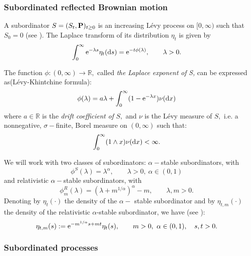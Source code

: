 \documentclass[11pt]{article}
\begin{document}
\subsubsection{Subordinated reflected Brownian motion}
A subordinator $S=(S_{t},{\bf P})_{t \geq 0}$ is an  increasing L\'evy process on $[0, \infty)$ such that $S_{0}=0$ (see \cite{bib:Ber}). \linebreak The Laplace transform of its distribution  $\eta_{t}$ is given by
$$
 \int_{0}^{\infty}{\rm e}^{-\lambda s}\eta_{t}({\rm d}s)={\rm e}^{-t\phi(\lambda)}, \qquad  \lambda > 0.
$$

The function $\phi:(0,\infty) \rightarrow \mathbb{R},$ called \textit{the Laplace exponent of S,} can be expressed as\linebreak({L\'evy-Khintchine formula}):
$$
\phi(\lambda) = a\lambda + \int_{0}^{\infty}(1 - {\rm e}^{-\lambda x})\nu({\rm d}x)
$$
where $a\in\mathbb R$  is the {\em drift coefficient of $S,$ }and $\nu$ is the L\'evy measure of $S,$ i.e. a nonnegative, $\sigma-$finite,  Borel measure on $(0, \infty)$ such that:
\begin{equation}\label{eq:Levy_measure_cond}
\int_{0}^{\infty}(1 \land x)\nu({\rm d}x) < \infty.
\end{equation}

\noindent We will work with two classes of subordinators: $\alpha-$stable subordinators, with
\begin{equation}\label{eq:phi_stable}
\phi^S(\lambda) = \lambda^{\alpha} , \qquad \lambda > 0, \ \alpha \in (0,1)
\end{equation}
and relativistic $\alpha-$stable subordinators, with
\begin{equation}\label{eq:phi_relativistic}
\phi^R_m(\lambda) = (\lambda + m^{1/\alpha})^{\alpha} - m, \qquad \lambda,m > 0.
\end{equation}
 Denoting by $\eta_t(\cdot)$  the density of the $\alpha-$ stable subordinator and by $\eta_{t,m}(\cdot)$  the density of the relativistic $\alpha$-stable subordinator, we have  (see \cite[p. 3]{bib:Ryz}):
\begin{equation}\label{eq:density_relativistic}
 \eta_{t,m}(s):={\rm e}^{-m^{1/\alpha}s + mt}\eta_{t}(s), \qquad m > 0, \ \alpha \in (0,1), \quad s,t > 0.
\end{equation}


\subsubsection{Subordinated processes }
\end{document}
